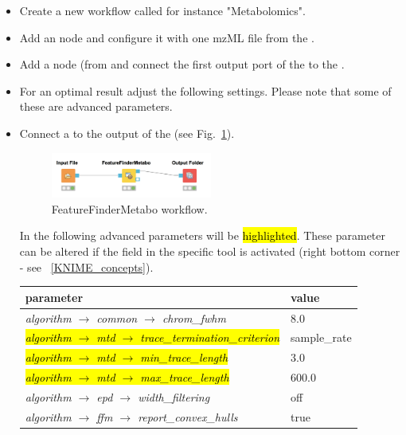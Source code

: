 \begin{itemize}
\item
Create a new workflow called for instance "Metabolomics".
\item
Add an  node and configure it with one mzML file from the .
\item
Add a  node (from  and connect the first output port of the  to the .
\item
For an optimal result adjust the following settings.
Please note that some of these are advanced parameters.
\item
Connect a  to the output of the  (see Fig.~\ref{fig:minimal_FFM_wf}).
\begin{figure}[!htbp]
  \centering
  \includegraphics[width=0.5\textwidth]{graphics/metabo/minimal_FFM_wf.png}
  \caption{FeatureFinderMetabo workflow.}
  \label{fig:minimal_FFM_wf}
\end{figure}

In the following advanced parameters will be \hl{highlighted}. These parameter can be altered if the  field in the specific tool is activated (right bottom corner - see ~\ref{KNIME_concepts}). 

\begin{center}
\begin{tabular}{l|l}
\textbf{parameter} & \textbf{value} \\ \hline
\textit{algorithm $\rightarrow$ common $\rightarrow$ chrom\_fwhm} & $8.0$ \\
\hl{\textit{algorithm $\rightarrow$ mtd $\rightarrow$ trace\_termination\_criterion}} & sample\_rate \\
\hl{\textit{algorithm $\rightarrow$ mtd $\rightarrow$ min\_trace\_length}} & $3.0$ \\
\hl{\textit{algorithm $\rightarrow$ mtd $\rightarrow$ max\_trace\_length}} & $600.0$\\
\textit{algorithm $\rightarrow$ epd $\rightarrow$ width\_filtering} & off \\
\textit{algorithm $\rightarrow$ ffm $\rightarrow$ report\_convex\_hulls} & true
\end{tabular}
\end{center}
\end{itemize}

